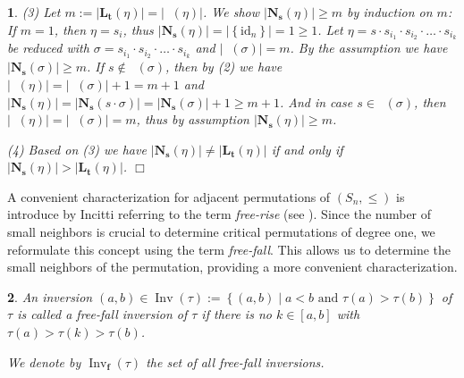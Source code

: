 \documentclass[a4 paper,12pt]{article}
\DeclareMathOperator{\Inv}{Inv}
\DeclareMathOperator{\Red}{R_{\textbf{d}}}
\newtheorem{subnum}{}[numeris]
\begin{document}
\begin{subnum}
 (3) Let $m:=  \left|\textbf{L}_{\textbf{t}}(\eta)\right| = \left|\Red(\eta)\right|$. We  show $\left|\textbf{N}_{\textbf{s}}(\eta)\right| \geq m$  by induction on $m$: If $m=1$, then $\eta =s_i $, thus $\left|\textbf{N}_{\textbf{s}}(\eta)\right| = \left| \left\{\textrm{id}_n\right\}\right|  = 1 \geq 1$. 
 Let  $\eta =s\cdot  s_{i_1}\cdot  s_{i_2}\cdot  \ldots \cdot  s_{i_k}$ be  reduced  with $\sigma = s_{i_1}\cdot  s_{i_2}\cdot  \ldots \cdot  s_{i_k}$ and  $\left|\Red(\sigma)\right|=m$. By the assumption we have $\left|\textbf{N}_{\textbf{s}}(\sigma)\right| \geq m$. 
If $s\not\in \Red(\sigma)$, then by (2) we have $\left|\Red(\eta)\right| = \left|\Red(\sigma)\right| +1= m +1$ and  $\left|\textbf{N}_{\textbf{s}}(\eta)\right| = \left|\textbf{N}_{\textbf{s}}(s\cdot\sigma)\right| = \left|\textbf{N}_{\textbf{s}}(\sigma)\right| +1 \geq m+1$. And in case 
 $s\in \Red(\sigma)$, then $\left|\Red(\eta)\right| = \left|\Red(\sigma)\right| = m$, thus by assumption $\left|\textbf{N}_{\textbf{s}}(\eta)\right| \geq m$. 
	
	(4) Based on (3) we have $\left|\textbf{N}_{\textbf{s}}(\eta)\right| \neq \left|\textbf{L}_{\textbf{t}}(\eta)\right| $ if and only if $\left|\textbf{N}_{\textbf{s}}(\eta)\right| >  \left|\textbf{L}_{\textbf{t}}(\eta)\right| $.
	\hfill $\Box$ 
\label{simple_transpositions_of_tau}
\end{subnum}
	
	



A convenient characterization for adjacent permutations of $(S_n, \leqslant)$ is  introduce by  Incitti referring to the term  \textit{free-rise} (see \cite[Def. 2.3]{Fed}).   
Since  the number of small neighbors is crucial to determine critical permutations of degree one, we reformulate this concept using the term \textit{free-fall}. This allows us to determine the small neighbors of the permutation, providing a more convenient characterization.

\begin{subnum} An inversion $(a,b)\in \Inv(\tau) := \left\{(a,b) \mid a<b \textrm{ and } \tau(a)>\tau(b)\right\}$ of $\tau$ is called  a \textit{\textit{free-fall}} inversion  of $\tau$ if there is \textit{no} $k\in \left[a,b\right]$ with $\tau(a)>\tau(k)>\tau(b)$.

  We denote by  $\Inv_{\textbf{f}}(\tau)$ the set of all free-fall inversions.  
\label{free_fall}
\end{subnum}
\end{document}
